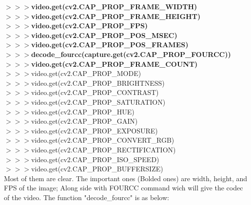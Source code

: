 \documentclass[a4paper,18pt]{article}
\begin{document}
$>>>$\textbf{video.get(cv2.CAP\_PROP\_FRAME\_WIDTH)}\\
\hspace*{14pt}$>>>$\textbf{video.get(cv2.CAP\_PROP\_FRAME\_HEIGHT)}\\
\hspace*{14pt}$>>>$\textbf{video.get(cv2.CAP\_PROP\_FPS)}\\
\hspace*{14pt}$>>>$\textbf{video.get(cv2.CAP\_PROP\_POS\_MSEC)}\\
\hspace*{14pt}$>>>$\textbf{video.get(cv2.CAP\_PROP\_POS\_FRAMES)}\\
\hspace*{14pt}$>>>$\textbf{decode\_fourcc(capture.get(cv2.CAP\_PROP\_FOURCC))}\\
\hspace*{14pt}$>>>$\textbf{video.get(cv2.CAP\_PROP\_FRAME\_COUNT)}\\
\hspace*{14pt}$>>>$video.get(cv2.CAP\_PROP\_MODE)\\
\hspace*{14pt}$>>>$video.get(cv2.CAP\_PROP\_BRIGHTNESS)\\
\hspace*{14pt}$>>>$video.get(cv2.CAP\_PROP\_CONTRAST)\\
\hspace*{14pt}$>>>$video.get(cv2.CAP\_PROP\_SATURATION)\\
\hspace*{14pt}$>>>$video.get(cv2.CAP\_PROP\_HUE)\\
\hspace*{14pt}$>>>$video.get(cv2.CAP\_PROP\_GAIN)\\
\hspace*{14pt}$>>>$video.get(cv2.CAP\_PROP\_EXPOSURE)\\
\hspace*{14pt}$>>>$video.get(cv2.CAP\_PROP\_CONVERT\_RGB)\\
\hspace*{14pt}$>>>$video.get(cv2.CAP\_PROP\_RECTIFICATION)\\
\hspace*{14pt}$>>>$video.get(cv2.CAP\_PROP\_ISO\_SPEED)\\
\hspace*{14pt}$>>>$video.get(cv2.CAP\_PROP\_BUFFERSIZE)\\

Most of them are clear. The important ones (Bolded ones) are width, height, and FPS of the image; Along side with FOURCC command wich will give the codec of the video. The function "decode\_fourcc" is as below:\\
\end{document}
